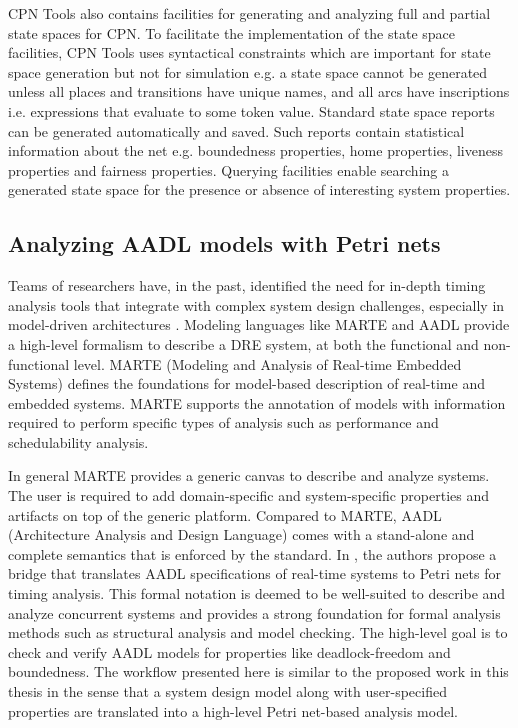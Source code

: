 CPN Tools also contains facilities for generating and analyzing full and partial state spaces for CPN. To facilitate the implementation of the state space facilities, CPN Tools uses syntactical constraints which are important for state space generation but not for simulation e.g. a state space cannot be generated unless all places and transitions have unique names, and all arcs have inscriptions i.e. expressions that evaluate to some token value. Standard state space reports can be generated automatically and saved. Such reports contain statistical information about the net e.g. boundedness properties, home properties, liveness properties and fairness properties. Querying facilities enable searching a generated state space for the presence or absence of interesting system properties. 

\subsection{Analyzing AADL models with Petri nets}

Teams of researchers have, in the past, identified the need for in-depth timing analysis tools that integrate with complex system design challenges, especially in model-driven architectures \cite{kordon_sn}. Modeling languages like MARTE \cite{MARTE:05} and AADL \cite{AADL_Intro:06} provide a high-level formalism to describe a DRE system, at both the functional and non-functional level. MARTE (Modeling and Analysis of Real-time Embedded Systems) defines the foundations for model-based description of real-time and embedded systems. MARTE supports the annotation of models with information required to perform specific types of analysis such as performance and schedulability analysis.

In general MARTE provides a generic canvas to describe and analyze systems. The user is required to add domain-specific and system-specific properties and artifacts on top of the generic platform. Compared to MARTE, AADL (Architecture Analysis and Design Language) comes with a stand-alone and complete semantics that is enforced by the standard. In \cite{kordon_sn}, the authors propose a bridge that translates AADL specifications of real-time systems to Petri nets for timing analysis. This formal notation is deemed to be well-suited to describe and analyze concurrent systems and provides a strong foundation for formal analysis \cite{girault2013petri} methods such as structural analysis and model checking. The high-level goal is to check and verify AADL models for properties like deadlock-freedom and boundedness. The workflow presented here is similar to the proposed work in this thesis in the sense that a system design model along with user-specified properties are translated into a high-level Petri net-based analysis model. 

